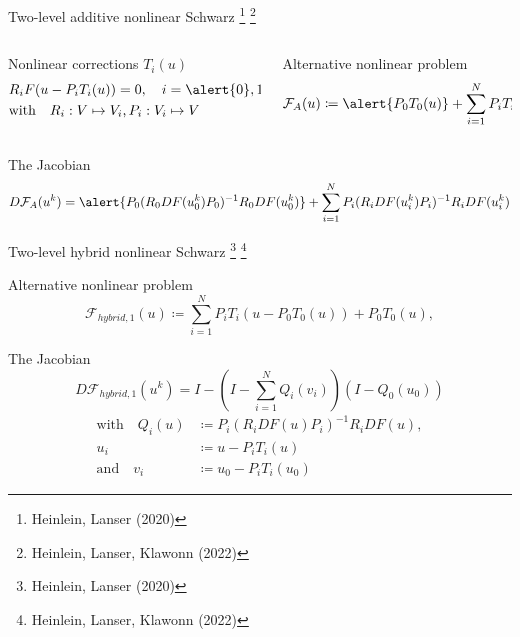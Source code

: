 \begin{frame}{Two-level additive nonlinear Schwarz \footnote{\tiny Heinlein, Lanser (2020)} \footnote{\tiny Heinlein, Lanser, Klawonn (2022)}}
	\vspace*{-5mm}
	\begin{columns}
		\begin{column}{0.5\textwidth}
			\begin{block}{\normalsize Nonlinear corrections $T_i(u)$}
				\vspace*{-1mm}
			      \begin{align*}
			      &R_iF(u-P_iT_i(u))  = 0, \quad i = \alert{0},1,2,\dots N\\ 
				  &\text{with}\quad R_i:V\mapsto V_i\text{,}\, P_i:V_i\mapsto V
		      \end{align*}
			\end{block}
		\end{column}
		\begin{column}{0.5\textwidth}
			\begin{block}{\normalsize Alternative nonlinear problem}
				\begin{equation*}
			      \mathcal{F}_A(u) \coloneqq \alert{P_0T_0(u)} + \sum_{i=1}^NP_iT_i(u) = 0
		      \end{equation*}
			\end{block}
		\end{column}
	\end{columns}
	\begin{block}{\normalsize The Jacobian}
		\vspace*{-2mm}
		\begin{align*}
			D\mathcal{F}_A(u^k)  = \alert{P_0(R_0DF(u_0^k)P_0)^{-1}R_0DF(u_0^k)} + \sum_{i=1}^NP_i(R_iDF(u_i^k)P_i)^{-1}R_iDF(u_i^k)
		\end{align*}
	\end{block}
\end{frame}

\begin{frame}{Two-level hybrid nonlinear Schwarz  \footnote[2]{\tiny Heinlein, Lanser (2020)} \footnote[3]{\tiny Heinlein, Lanser, Klawonn (2022)}}
	\vspace*{-5mm}
	\begin{block}{\normalsize Alternative nonlinear problem}
		\begin{equation*}
			\mathcal{F}_{hybrid,1}(u) \coloneqq \sum_{i=1}^NP_iT_i(u-P_0T_0(u)) + P_0T_0(u), 
		\end{equation*}
	\end{block}
	\begin{block}{\normalsize The Jacobian}
		\vspace*{-2mm}
		\begin{equation*}
			D\mathcal{F}_{hybrid,1}(u^k) = I - \left(I-\sum_{i=1}^NQ_i(v_i)\right)(I-Q_0(u_0))
		\end{equation*}
		\begin{align*}
			\text{with}\quad Q_i(u)&\coloneqq P_i(R_iDF(u)P_i)^{-1}R_iDF(u),\\
			u_i&\coloneqq u-P_iT_i(u)\\
			\text{and}\quad v_i&\coloneqq u_0-P_iT_i(u_0)
		\end{align*}
	\end{block}
\end{frame}
